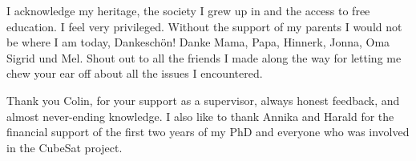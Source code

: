 I acknowledge my heritage, the society I grew up in and the access to free education.
I feel very privileged. 
Without the support of my parents I would not be where I am
today, Dankesch{\"o}n! 
Danke Mama, Papa, Hinnerk, Jonna, Oma Sigrid und Mel. 
Shout out to all the friends I made along the way for letting me chew your ear off about
all the issues I encountered.

Thank you Colin, for your support as a supervisor, always honest feedback, and almost
never-ending knowledge. 
I also like to thank Annika and Harald for the financial support of the first two years of my PhD and everyone who was involved in the CubeSat project.
%
%
%
%
%
